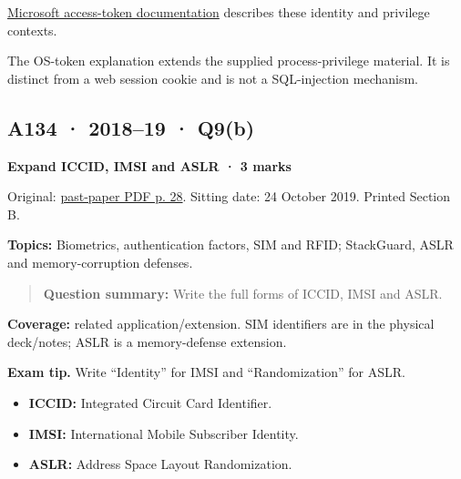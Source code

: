 \documentclass[11pt,a4paper]{article}
\begin{document}
\href{https://learn.microsoft.com/en-us/windows/win32/secauthz/access-tokens}{Microsoft access-token documentation} describes these identity and privilege contexts.


The OS-token explanation extends the supplied process-privilege material. It is distinct from a web session cookie and is not a SQL-injection mechanism.




\clearpage
\subsection{A134 · 2018–19 · Q9(b)}\label{a134}

\textbf{Expand ICCID,\allowbreak{} IMSI and ASLR · 3 marks}


Original: \href{../../CSE405-Security_Merged.pdf\#page=28}{past-paper PDF p. 28}. Sitting date: 24 October 2019. Printed Section B.


\textbf{Topics:} Biometrics,\allowbreak{} authentication factors,\allowbreak{} SIM and RFID; StackGuard,\allowbreak{} ASLR and memory-corruption defenses.



\begin{quote}\small

\textbf{Question summary:} Write the full forms of ICCID,\allowbreak{} IMSI and ASLR.



\end{quote}

\textbf{Coverage:} related application/\allowbreak{}extension. SIM identifiers are in the physical deck/\allowbreak{}notes; ASLR is a memory-defense extension.



{\color{ForestGreen}\textbf{Exam tip.} Write “Identity” for IMSI and “Randomization” for ASLR.}



\begin{itemize}

\item \textbf{ICCID:} Integrated Circuit Card Identifier.

\item \textbf{IMSI:} International Mobile Subscriber Identity.

\item \textbf{ASLR:} Address Space Layout Randomization.

\end{itemize}
\end{document}
